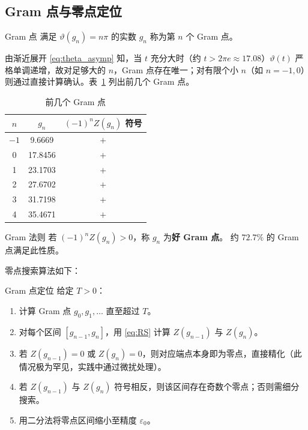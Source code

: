 \subsection{Gram 点与零点定位}

\begin{definition}{Gram 点}{}
满足 $\vartheta(g_n) = n\pi$ 的实数 $g_n$ 称为第 $n$ 个 Gram 点。
\end{definition}

由渐近展开 \eqref{eq:theta_asymp} 知，当 $t$ 充分大时（约 $t>2\pi e\approx17.08$）$\vartheta(t)$ 严格单调递增，故对足够大的 $n$，Gram 点存在唯一；对有限个小 $n$（如 $n=-1,0$）则通过直接计算确认。表~\ref{tab:gram} 列出前几个 Gram 点。

\begin{table}[htbp]
\centering
\caption{前几个 Gram 点}
\label{tab:gram}
\begin{tabular}{@{}ccc@{}}
\toprule
$n$ & $g_n$ & $(-1)^n Z(g_n)$ 符号 \\
\midrule
$-1$ & 9.6669 & $+$ \\
0 & 17.8456 & $+$ \\
1 & 23.1703 & $+$ \\
2 & 27.6702 & $+$ \\
3 & 31.7198 & $+$ \\
4 & 35.4671 & $+$ \\
\bottomrule
\end{tabular}
\end{table}

\begin{definition}{Gram 法则}{}
若 $(-1)^n Z(g_n) > 0$，称 $g_n$ 为\textbf{好 Gram 点}。
约 $72.7\%$ 的 Gram 点满足此性质。
\end{definition}

零点搜索算法如下：

\begin{alg}{Gram 点定位}{}
\label{alg:gram}
给定 $T>0$：
\begin{enumerate}
  \item 计算 Gram 点 $g_0,g_1,\ldots$ 直至超过 $T$。
  \item 对每个区间 $[g_{n-1},g_n]$，用 \eqref{eq:RS} 计算 $Z(g_{n-1})$ 与 $Z(g_n)$。
  \item 若 $Z(g_{n-1})=0$ 或 $Z(g_n)=0$，则对应端点本身即为零点，直接精化（此情况极为罕见，实践中通过微扰处理）。
  \item 若 $Z(g_{n-1})$ 与 $Z(g_n)$ 符号相反，则该区间存在奇数个零点；否则需细分搜索。
  \item 用二分法将零点区间缩小至精度 $\varepsilon_0$。
\end{enumerate}
\end{alg}


